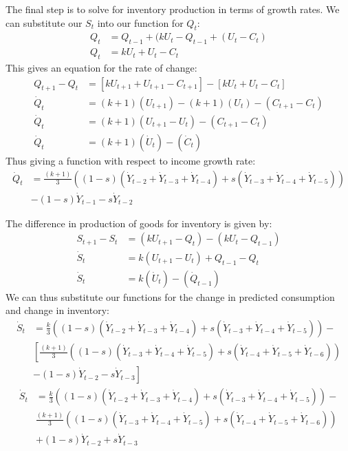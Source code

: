 The final step is to solve for inventory production in terms of growth rates. We can substitute our $S_t$ into our function for $Q_t$:
\begin{align*}
    Q_t&=Q_{t-1}+(kU_t-Q_{t-1}+(U_t-C_t)\\
    Q_t&=kU_t+U_t-C_t
\end{align*}
This gives an equation for the rate of change:
\begin{align*}
    Q_{t+1}-Q_{t}&=\left[kU_{t+1}+U_{t+1}-C_{t+1}\right]-\left[kU_{t}+U_{t}-C_{t}\right]\\
    \dot Q_t&= (k+1)(U_{t+1})-(k+1)(U_t)-(C_{t+1}-C_t)\\
    \dot Q_t&= (k+1)(U_{t+1}-U_t)-(C_{t+1}-C_t)\\
    \dot Q_t&=(k+1)(\dot U_t)-(\dot C_t)
\end{align*}
Thus giving a function with respect to income growth rate:
\begin{equation}
\begin{split}
    \dot Q_t& = \frac{(k+1)}{3}\left((1-s)(\dot Y_{t-2}+\dot Y_{t-3}+\dot Y_{t-4})+s(\dot Y_{t-3}+\dot Y_{t-4}+\dot Y_{t-5})\right)\\
    &-(1-s)\dot Y_{t-1}-s\dot Y_{t-2}
\end{split}
\end{equation}

The difference in production of goods for inventory is given by:
\begin{align*}
    S_{t+1}-S_{t}& =(kU_{t+1}-Q_{t})-(kU_{t}-Q_{t-1})\\
    \dot S_t &= k(U_{t+1}-U_t)+Q_{t-1}-Q_t\\
    \dot S_t& = k(\dot U_t)-(\dot Q_{t-1})
\end{align*}
We can thus substitute our functions for the change in predicted consumption and change in inventory:
\begin{equation*}
\begin{split}
    \dot S_t& =\frac{k}{3}\left((1-s)(\dot Y_{t-2}+\dot Y_{t-3}+\dot Y_{t-4})+s(\dot Y_{t-3}+\dot Y_{t-4}+\dot Y_{t-5})\right)-\\
    &\left[\frac{(k+1)}{3}\left((1-s)(\dot Y_{t-3}+\dot Y_{t-4}+\dot Y_{t-5})+s(\dot Y_{t-4}+\dot Y_{t-5}+\dot Y_{t-6})\right)\\
    &\left.-(1-s)\dot Y_{t-2}-s\dot Y_{t-3}\right]
\end{split}
\end{equation*}
\begin{equation}
\begin{split}
    \dot S_t& =\frac{k}{3}\left((1-s)(\dot Y_{t-2}+\dot Y_{t-3}+\dot Y_{t-4})+s(\dot Y_{t-3}+\dot Y_{t-4}+\dot Y_{t-5})\right)-\\
    &\frac{(k+1)}{3}\left((1-s)(\dot Y_{t-3}+\dot Y_{t-4}+\dot Y_{t-5})+s(\dot Y_{t-4}+\dot Y_{t-5}+\dot Y_{t-6})\right)\\
    &+(1-s)\dot Y_{t-2}+s\dot Y_{t-3}
\end{split}
\end{equation}


